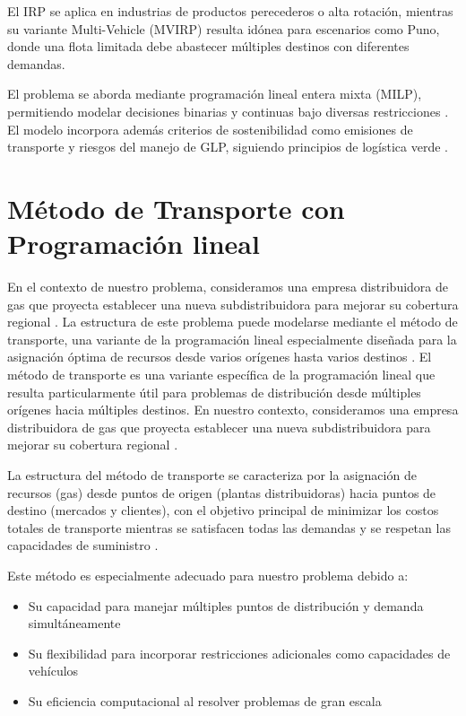 \documentclass[11pt, a4paper]{article}
\begin{document}
El IRP se aplica en industrias de productos perecederos o alta rotación, mientras su variante Multi-Vehicle (MVIRP) resulta idónea para escenarios como Puno, donde una flota limitada debe abastecer múltiples destinos con diferentes demandas.

El problema se aborda mediante programación lineal entera mixta (MILP), permitiendo modelar decisiones binarias y continuas bajo diversas restricciones \citep{Taha, 2017; Winston, 2004}. El modelo incorpora además criterios de sostenibilidad como emisiones de transporte y riesgos del manejo de GLP, siguiendo principios de logística verde \citep{Dekker et al., 2012}.

\section{Método de Transporte con Programación lineal}
En el contexto de nuestro problema, consideramos una empresa distribuidora de gas que proyecta establecer una nueva subdistribuidora para mejorar su cobertura regional \citep{Taha2017}. La estructura de este problema puede modelarse mediante el método de transporte, una variante de la programación lineal especialmente diseñada para la asignación óptima de recursos desde varios orígenes hasta varios destinos \citep{Hillier2010}.
El método de transporte es una variante específica de la programación lineal que resulta particularmente útil para problemas de distribución desde múltiples orígenes hacia múltiples destinos. En nuestro contexto, consideramos una empresa distribuidora de gas que proyecta establecer una nueva subdistribuidora para mejorar su cobertura regional \citep{Taha2017}.

La estructura del método de transporte se caracteriza por la asignación de recursos (gas) desde puntos de origen (plantas distribuidoras) hacia puntos de destino (mercados y clientes), con el objetivo principal de minimizar los costos totales de transporte mientras se satisfacen todas las demandas y se respetan las capacidades de suministro \citep{Hillier2010}.

Este método es especialmente adecuado para nuestro problema debido a:
\begin{itemize}[leftmargin=*]
    \item Su capacidad para manejar múltiples puntos de distribución y demanda simultáneamente
    \item Su flexibilidad para incorporar restricciones adicionales como capacidades de vehículos
    \item Su eficiencia computacional al resolver problemas de gran escala
\end{itemize}
\end{document}
